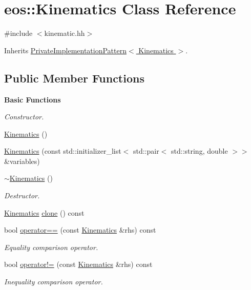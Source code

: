 \hypertarget{classeos_1_1Kinematics}{
\section{eos::Kinematics Class Reference}
\label{classeos_1_1Kinematics}
}


{\ttfamily \#include $<$kinematic.hh$>$}

Inherits \hyperlink{classeos_1_1PrivateImplementationPattern}{PrivateImplementationPattern$<$ Kinematics $>$}.\subsection*{Public Member Functions}
\begin{Indent}{\bf Basic Functions}\par
{\em \label{_amgrp2386c9a1f1785edee33f374dd2db9b3d}
 Constructor. }\begin{DoxyCompactItemize}
\item 
\hyperlink{classeos_1_1Kinematics_a5385a72bcc6db8568a82808d6f02aa9b}{Kinematics} ()
\item 
\hyperlink{classeos_1_1Kinematics_add9a8894b7712980d4ff89440ba87f5c}{Kinematics} (const std::initializer\_\-list$<$ std::pair$<$ std::string, double $>$$>$ \&variables)
\item 
\hyperlink{classeos_1_1Kinematics_a9ec2eee0f195a921a50de942bfb7d38f}{$\sim$Kinematics} ()
\begin{DoxyCompactList}\small\item\em Destructor. \item\end{DoxyCompactList}\item 
\hyperlink{classeos_1_1Kinematics}{Kinematics} \hyperlink{classeos_1_1Kinematics_aedd9681136ab3735fb754e2840e10715}{clone} () const 
\item 
bool \hyperlink{classeos_1_1Kinematics_a7c2edc2b99e1cfd20b71ebd3dcc64d6f}{operator==} (const \hyperlink{classeos_1_1Kinematics}{Kinematics} \&rhs) const 
\begin{DoxyCompactList}\small\item\em Equality comparison operator. \item\end{DoxyCompactList}\item 
bool \hyperlink{classeos_1_1Kinematics_a20f3e18e4c4157196d7c384ae2f2f2d7}{operator!=} (const \hyperlink{classeos_1_1Kinematics}{Kinematics} \&rhs) const 
\begin{DoxyCompactList}\small\item\em Inequality comparison operator. \item\end{DoxyCompactList}\end{DoxyCompactItemize}
\end{Indent}
